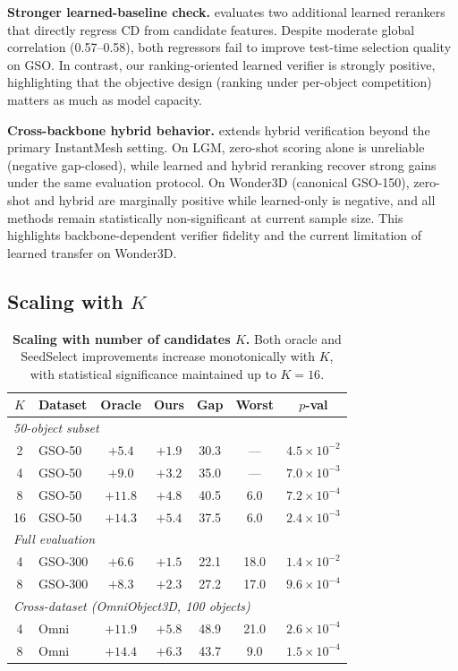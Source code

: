 \noindent\textbf{Stronger learned-baseline check.}
 evaluates two additional learned rerankers that directly regress CD from candidate features. Despite moderate global correlation (0.57--0.58), both regressors fail to improve test-time selection quality on GSO. In contrast, our ranking-oriented learned verifier is strongly positive, highlighting that the objective design (ranking under per-object competition) matters as much as model capacity.

\noindent\textbf{Cross-backbone hybrid behavior.}
 extends hybrid verification beyond the primary InstantMesh setting. On LGM, zero-shot scoring alone is unreliable (negative gap-closed), while learned and hybrid reranking recover strong gains under the same evaluation protocol. On Wonder3D (canonical GSO-150), zero-shot and hybrid are marginally positive while learned-only is negative, and all methods remain statistically non-significant at current sample size. This highlights backbone-dependent verifier fidelity and the current limitation of learned transfer on Wonder3D.

\subsection{Scaling with $K$}
\label{sec:scaling}

\begin{table}[t]
\centering
\caption{\textbf{Scaling with number of candidates $K$.} Both oracle and SeedSelect improvements increase monotonically with $K$, with statistical significance maintained up to $K{=}16$.}
\label{tab:scaling}
\begin{tabular}{c|l|cc|ccc}
\toprule
$K$ & Dataset & Oracle & Ours & Gap & Worst & $p$-val \\
\midrule
\multicolumn{7}{l}{\emph{50-object subset}} \\
2 & GSO-50 & $+5.4$ & $+1.9$ & 30.3 & --- & $4.5 \times 10^{-2}$ \\
4 & GSO-50 & $+9.0$ & $+3.2$ & 35.0 & --- & $7.0 \times 10^{-3}$ \\
8 & GSO-50 & $+11.8$ & $+4.8$ & 40.5 & 6.0 & $7.2 \times 10^{-4}$ \\
16 & GSO-50 & $+14.3$ & $+5.4$ & 37.5 & 6.0 & $2.4 \times 10^{-3}$ \\
\midrule
\multicolumn{7}{l}{\emph{Full evaluation}} \\
4 & GSO-300 & $+6.6$ & $+1.5$ & 22.1 & 18.0 & $1.4 \times 10^{-2}$ \\
8 & GSO-300 & $+8.3$ & $+2.3$ & 27.2 & 17.0 & $9.6 \times 10^{-4}$ \\
\midrule
\multicolumn{7}{l}{\emph{Cross-dataset (OmniObject3D, 100 objects)}} \\
4 & Omni & $+11.9$ & $+5.8$ & 48.9 & 21.0 & $2.6 \times 10^{-4}$ \\
8 & Omni & $+14.4$ & $+6.3$ & 43.7 & 9.0 & $1.5 \times 10^{-4}$ \\
\bottomrule
\end{tabular}
\end{table}

